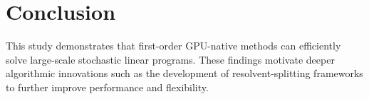 \section{Conclusion}
This study demonstrates that first-order GPU-native methods can efficiently solve large-scale stochastic linear programs. These findings motivate deeper algorithmic innovations such as the development of resolvent-splitting frameworks to further improve performance and flexibility.